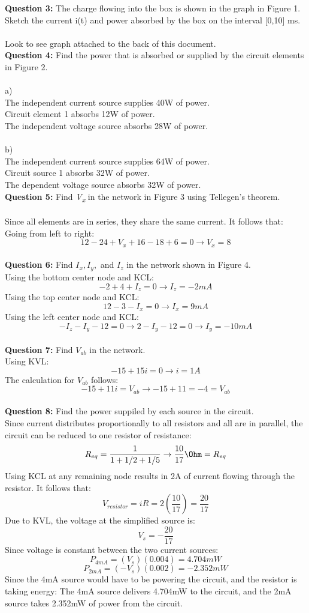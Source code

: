\documentclass{article}
\begin{document}
\textbf{Question 3:} The charge flowing into the box is shown in the graph in Figure 1. Sketch the current i(t) and power absorbed by the box on the interval [0,10] ms.\\
\\
Look to see graph attached to the back of this document.\\


\textbf{Question 4:} Find the power that is absorbed or supplied by the circuit elements in Figure 2.\\
\\
\tab a) \\
The independent current source supplies 40W of power.\\
Circuit element 1 absorbs 12W of power.\\
The independent voltage source absorbs 28W of power.\\
\\
\tab b) \\
The independent current source supplies 64W of power.\\
Circuit source 1 absorbs 32W of power.\\
The dependent voltage source absorbs 32W of power.\\


\textbf{Question 5:} Find \textit{V\textsubscript{x}} in the network in Figure 3 using Tellegen's theorem.\\
\\
Since all elements are in series, they share the same current. It follows that:
Going from left to right:
\[12-24+V_x+16-18+6=0 \rightarrow V_x = 8 \]
\\
\textbf{Question 6:} Find $I_x,I_y,$ and $I_z$ in the network shown in Figure 4.
\\
Using the bottom center node and KCL:
\[ -2 + 4 + I_z = 0 \rightarrow I_z = -2mA \]
Using the top center node and KCL:
\[12-3-I_x = 0 \rightarrow I_x = 9mA \]
Using the left center node and KCL:
\[ -I_z - I_y - 12 = 0 \rightarrow 2-I_y-12=0 \rightarrow I_y=-10mA \]
\\
\textbf{Question 7:} Find $V_{ab}$ in the network.
\\
Using KVL:
\[ -15 +15i = 0 \rightarrow i = 1A \]
The calculation for $V_{ab}$ follows:
\[ -15+11i = V_{ab} \rightarrow -15+11=-4=V_{ab} \]
\\
\textbf{Question 8:} Find the power suppiled by each source in the circuit.
\\
Since current distributes proportionally to all resistors and all are in parallel, the circuit can be reduced to one resistor of resistance:
\[ R_{eq} = \frac{1}{1+1/2+1/5} \rightarrow \frac{10}{17}\Ohm = R_{eq} \]
Using KCL at any remaining node results in 2A of current flowing through the resistor. It follows that:
\[ V_{resistor} = iR = 2(\frac{10}{17}) = \frac{20}{17} \]
Due to KVL, the voltage at the simplified source is:
\[ V_s = -\frac{20}{17} \]
Since voltage is constant between the two current sources:
\[ P_{4mA} = (V_s)(0.004) = 4.704mW \]
\[ P_{2mA} = (-V_s)(0.002) =-2.352mW \]
Since the 4mA source would have to be powering the circuit, and the resistor is taking energy:
The 4mA source delivers 4.704mW to the circuit, and the 2mA source takes 2.352mW of power from the circuit. 
\end{document}
